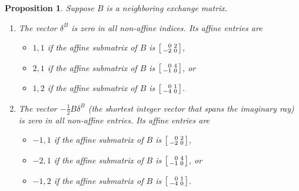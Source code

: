 \documentclass[10pt]{article}
\newtheorem{proposition}{Proposition}[section]
\theoremstyle{definition}
\theoremstyle{remark}
\numberwithin{equation}{section}
\newcommand{\0}{{\mathbf{0}}}
\begin{document}
\begin{proposition}\label{neigh good stuff}
Suppose $B$ is a neighboring exchange matrix.
\begin{enumerate}[label=\bf\arabic*., ref=\arabic*]
\item\label{neigh delta}
The vector $\delta^B$ is zero in all non-affine indices.
Its affine entries are
\begin{itemize}
\item
$1,1$ if the affine submatrix of $B$ is $\begin{bsmallmatrix*}[r]0&2\\-2&0\end{bsmallmatrix*}$,
\item
$2,1$ if the affine submatrix of $B$ is $\begin{bsmallmatrix*}[r]0&4\\-1&0\end{bsmallmatrix*}$, or
\item
$1,2$ if the affine submatrix of $B$ is $\begin{bsmallmatrix*}[r]0&1\\-4&0\end{bsmallmatrix*}$.
\end{itemize}
\item\label{neigh im ray}
The vector $-\frac12B\delta^B$ (the shortest integer vector that spans the imaginary ray) is zero in all non-affine entries.
Its affine entries are
\begin{itemize}
\item
$-1,1$ if the affine submatrix of $B$ is $\begin{bsmallmatrix*}[r]0&2\\-2&0\end{bsmallmatrix*}$,
\item
$-2,1$ if the affine submatrix of $B$ is $\begin{bsmallmatrix*}[r]0&4\\-1&0\end{bsmallmatrix*}$, or
\item
$-1,2$ if the affine submatrix of $B$ is $\begin{bsmallmatrix*}[r]0&1\\-4&0\end{bsmallmatrix*}$.
\end{itemize}
\end{enumerate}
\end{proposition}
\end{document}
